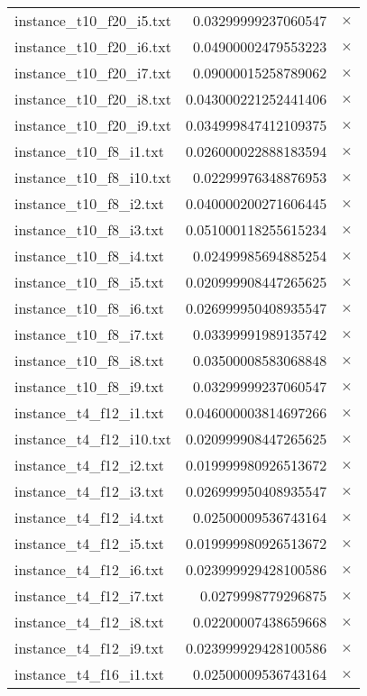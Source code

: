 \documentclass{article}
\begin{document}
\begin{center}
\begin{tabular}{|l|rr|}
instance\_t10\_f20\_i5.txt & 0.03299999237060547 & $\times$ \\
instance\_t10\_f20\_i6.txt & 0.04900002479553223 & $\times$ \\
instance\_t10\_f20\_i7.txt & 0.09000015258789062 & $\times$ \\
instance\_t10\_f20\_i8.txt & 0.043000221252441406 & $\times$ \\
instance\_t10\_f20\_i9.txt & 0.034999847412109375 & $\times$ \\
instance\_t10\_f8\_i1.txt & 0.026000022888183594 & $\times$ \\
instance\_t10\_f8\_i10.txt & 0.02299976348876953 & $\times$ \\
instance\_t10\_f8\_i2.txt & 0.040000200271606445 & $\times$ \\
instance\_t10\_f8\_i3.txt & 0.051000118255615234 & $\times$ \\
instance\_t10\_f8\_i4.txt & 0.02499985694885254 & $\times$ \\
instance\_t10\_f8\_i5.txt & 0.020999908447265625 & $\times$ \\
instance\_t10\_f8\_i6.txt & 0.026999950408935547 & $\times$ \\
instance\_t10\_f8\_i7.txt & 0.03399991989135742 & $\times$ \\
instance\_t10\_f8\_i8.txt & 0.03500008583068848 & $\times$ \\
instance\_t10\_f8\_i9.txt & 0.03299999237060547 & $\times$ \\
instance\_t4\_f12\_i1.txt & 0.046000003814697266 & $\times$ \\
instance\_t4\_f12\_i10.txt & 0.020999908447265625 & $\times$ \\
instance\_t4\_f12\_i2.txt & 0.019999980926513672 & $\times$ \\
instance\_t4\_f12\_i3.txt & 0.026999950408935547 & $\times$ \\
instance\_t4\_f12\_i4.txt & 0.02500009536743164 & $\times$ \\
instance\_t4\_f12\_i5.txt & 0.019999980926513672 & $\times$ \\
instance\_t4\_f12\_i6.txt & 0.023999929428100586 & $\times$ \\
instance\_t4\_f12\_i7.txt & 0.0279998779296875 & $\times$ \\
instance\_t4\_f12\_i8.txt & 0.02200007438659668 & $\times$ \\
instance\_t4\_f12\_i9.txt & 0.023999929428100586 & $\times$ \\
instance\_t4\_f16\_i1.txt & 0.02500009536743164 & $\times$ \\

\end{tabular}
\end{center}
\end{document}
